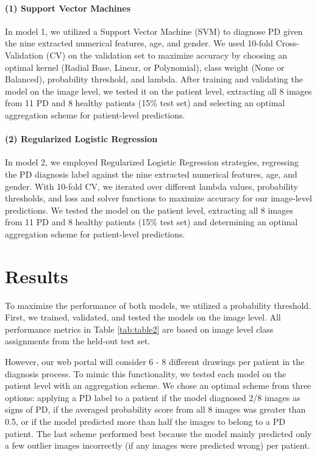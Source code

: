 \documentclass[pmlr,twocolumn,10pt]{jmlr} %
\begin{document}
\label{sec:SVM}  
\paragraph{(1) Support Vector Machines} In model 1, we utilized a Support Vector Machine (SVM) \citep{708428} to diagnose PD given the nine extracted numerical features, age, and gender. We used 10-fold Cross-Validation (CV) \citep{stone1974cross} on the validation set to maximize accuracy by choosing an optimal kernel (Radial Base, Linear, or Polynomial), class weight (None or Balanced), probability threshold, and lambda. After training and validating the model on the image level, we tested it on the patient level, extracting all 8 images from 11 PD and 8 healthy patients (15\% test set) and selecting an optimal aggregation scheme for patient-level predictions.  

\label{sec:LogReg}  
\paragraph{(2) Regularized Logistic Regression} In model 2, we employed Regularized Logistic Regression \citep{tibshirani1996regression} strategies, regressing the PD diagnosis label against the nine extracted numerical features, age, and gender. With 10-fold CV, we iterated over different lambda values, probability thresholds, and loss and solver functions to maximize accuracy for our image-level predictions. We tested the model on the patient level, extracting all 8 images from 11 PD and 8 healthy patients (15\% test set) and determining an optimal aggregation scheme for patient-level predictions.  

\section{Results}
\label{Results} To maximize the performance of both models, we utilized a probability threshold. First, we trained, validated, and tested the models on the image level. All performance metrics in Table \ref{tab:table2} are based on image level class assignments from the held-out test set.

However, our web portal will consider 6 - 8 different drawings per patient in the diagnosis process. To mimic this functionality, we tested each model on the patient level with an aggregation scheme. We chose an optimal scheme from three options: applying a PD label to a patient if the model diagnosed 2/8 images as signs of PD, if the averaged probability score from all 8 images was greater than 0.5, or if the model predicted more than half the images to belong to a PD patient. The last scheme performed best because the model mainly predicted only a few outlier images incorrectly (if any images were predicted wrong) per patient.
\end{document}
